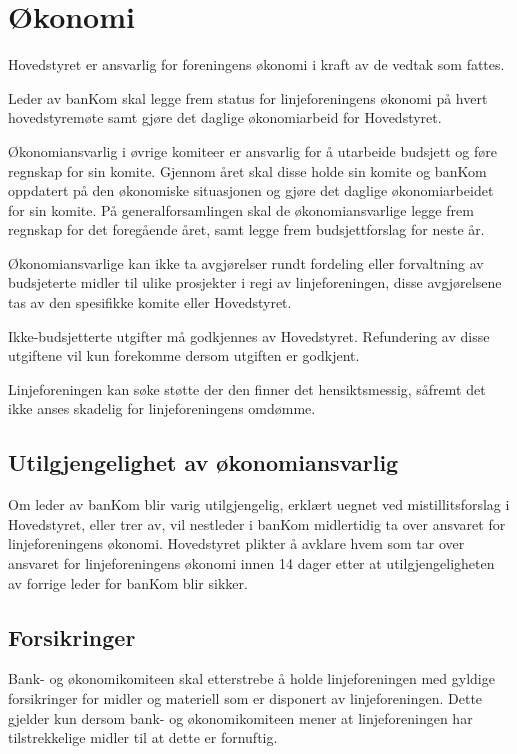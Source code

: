 \chapter{Økonomi}
\label{chap:okonomi}
Hovedstyret er ansvarlig for foreningens økonomi i kraft av de vedtak som fattes. \newline

Leder av banKom skal legge frem status for linjeforeningens økonomi på hvert \linebreak hovedstyremøte samt gjøre det daglige økonomiarbeid for Hovedstyret.\newline

Økonomiansvarlig i øvrige komiteer er ansvarlig for å utarbeide budsjett og føre regnskap for sin komite. Gjennom året skal disse holde sin komite og banKom oppdatert på den økonomiske situasjonen og gjøre det daglige økonomiarbeidet for sin komite. På generalforsamlingen skal de økonomiansvarlige legge frem regnskap for det foregående året, samt legge frem budsjettforslag for neste år.\newline

Økonomiansvarlige kan ikke ta avgjørelser rundt fordeling eller forvaltning av \linebreak budsjeterte midler til ulike prosjekter i regi av linjeforeningen, disse avgjørelsene tas av den spesifikke komite eller Hovedstyret.\newline

Ikke-budsjetterte utgifter må godkjennes av Hovedstyret. Refundering av disse \linebreak utgiftene vil kun forekomme dersom utgiften er godkjent.\newline

Linjeforeningen kan søke støtte der den finner det hensiktsmessig, såfremt det ikke anses skadelig for linjeforeningens omdømme.\newline

\section{Utilgjengelighet av økonomiansvarlig}

Om leder av banKom blir varig utilgjengelig, erklært uegnet ved mistillitsforslag i Hovedstyret, eller trer av, vil nestleder i banKom midlertidig ta over ansvaret for linjeforeningens økonomi. Hovedstyret plikter å avklare hvem som tar over ansvaret for linjeforeningens økonomi innen 14 dager etter at utilgjengeligheten av forrige leder for banKom blir sikker. 

\section{Forsikringer}
Bank- og økonomikomiteen skal etterstrebe å holde linjeforeningen med gyldige forsikringer for midler og materiell som er disponert av linjeforeningen. Dette gjelder kun dersom bank- og økonomikomiteen mener at linjeforeningen har tilstrekkelige midler til at dette er fornuftig.
